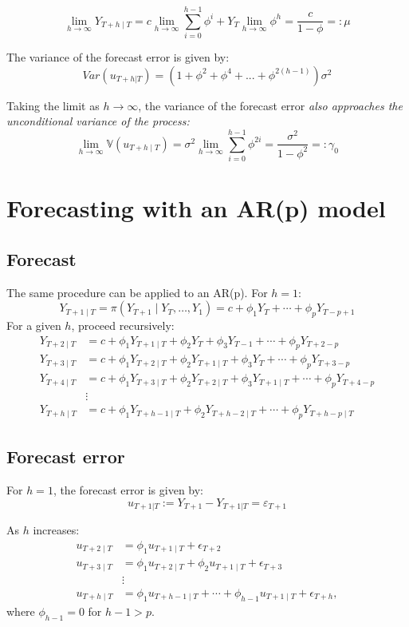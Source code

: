 \documentclass[11pt, a4paper]{report}
\theoremstyle{plain}
\theoremstyle{plain}
\theoremstyle{remark}
\begin{document}
$$\lim _{h \rightarrow \infty} Y_{T+h \mid T}=c \lim _{h \rightarrow \infty} \sum_{i=0}^{h-1} \phi^{i}+Y_{T} \lim _{h \rightarrow \infty} \phi^{h}=\frac{c}{1-\phi}=: \mu$$

The variance of the forecast error is given by:
$$ Var(u_{T+h|T}) = (1 + \phi^{2} + \phi^4 + ... + \phi^{2(h-1)})\sigma^2 $$

Taking the limit as $h \to \infty$, the variance of the forecast error \textit{also approaches the unconditional variance of the process:}
$$\lim _{h \rightarrow \infty} \mathbb{V}\left(u_{T+h \mid T}\right)=\sigma^{2} \lim _{h \rightarrow \infty} \sum_{i=0}^{h-1} \phi^{2 i}=\frac{\sigma^{2}}{1-\phi^{2}}=: \gamma_{0}$$

\section{Forecasting with an AR(p) model}

\subsection{Forecast}

The same procedure can be applied to an AR(p). For $h = 1$: 
$$
Y_{T+1 \mid T}=\pi\left(Y_{T+1} \mid Y_{T}, \ldots, Y_{1}\right)=c+\phi_{1} Y_{T}+\cdots+\phi_{p} Y_{T-p+1}
$$
For a given $h$, proceed recursively:
$$\begin{aligned}
	Y_{T+2 \mid T} &=c+\phi_{1} Y_{T+1 \mid T}+\phi_{2} Y_{T}+\phi_{3} Y_{T-1}+\cdots+\phi_{p} Y_{T+2-p} \\
	Y_{T+3 \mid T} &=c+\phi_{1} Y_{T+2 \mid T}+\phi_{2} Y_{T+1 \mid T}+\phi_{3} Y_{T}+\cdots+\phi_{p} Y_{T+3-p} \\
	Y_{T+4 \mid T} &=c+\phi_{1} Y_{T+3 \mid T}+\phi_{2} Y_{T+2 \mid T}+\phi_{3} Y_{T+1 \mid T}+\cdots+\phi_{p} Y_{T+4-p} \\
	& \vdots \\
	Y_{T+h \mid T} &=c+\phi_{1} Y_{T+h-1 \mid T}+\phi_{2} Y_{T+h-2 \mid T}+\cdots+\phi_{p} Y_{T+h-p \mid T}
\end{aligned}$$

\subsection{Forecast error}

For $h=1$, the forecast error is given by:
$$ u_{T+1|T} := Y_{T+1} - Y_{T+1|T} = \varepsilon_{T+1}$$

As $h$ increases:
$$\begin{aligned}
	u_{T+2 \mid T} &=\phi_{1} u_{T+1 \mid T}+\epsilon_{T+2} \\
	u_{T+3 \mid T} &=\phi_{1} u_{T+2 \mid T}+\phi_{2} u_{T+1 \mid T}+\epsilon_{T+3} \\
	& \vdots \\
	u_{T+h \mid T} &=\phi_{1} u_{T+h-1 \mid T}+\cdots+\phi_{h-1} u_{T+1 \mid T}+\epsilon_{T+h},
\end{aligned}$$
where $\phi_{h-1} = 0$ for $h-1>p$.
\end{document}
